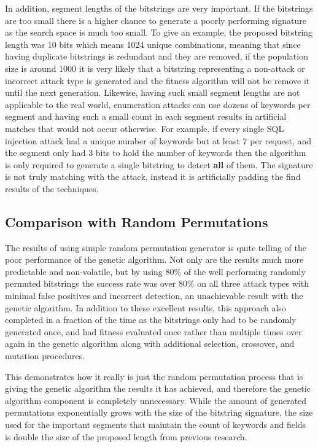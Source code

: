 In addition, segment lengths of the bitstrings are very important.  If the bitstrings are too small there is a higher chance to generate a poorly performing signature as the search space is much too small.  To give an example, the proposed bitstring length was 10 bits which means 1024 unique combinations, meaning that since having duplicate bitstrings is redundant and they are removed, if the population size is around 1000 it is very likely that a bitstring representing a non-attack or incorrect attack type is generated and the fitness algorithm will not be remove it until the next generation.  Likewise, having such small segment lengths are not applicable to the real world, enumeration attacks can use dozens of keywords per segment and having such a small count in each segment results in artificial matches that would not occur otherwise.  For example, if every single SQL injection attack had a unique number of keywords but at least 7 per request, and the segment only had 3 bits to hold the number of keywords then the algorithm is only required to generate a single bitstring to detect \textbf{all} of them.  The signature is not truly matching with the attack, instead it is artificially padding the find results of the techniques.

\subsection{Comparison with Random Permutations}\label{sec:randDiscussion}

The results of using simple random permutation generator is quite telling of the poor performance of the genetic algorithm.  Not only are the results much more predictable and non-volatile, but by using 80\% of the well performing randomly permuted bitstrings the success rate was over 80\% on all three attack types with minimal false positives and incorrect detection, an unachievable result with the genetic algorithm.  In addition to these excellent results, this approach also completed in a fraction of the time as the bitstrings only had to be randomly generated once, and had fitness evaluated once rather than multiple times over again in the genetic algorithm along with additional selection, crossover, and mutation procedures.

This demonstrates how it really is just the random permutation process that is giving the genetic algorithm the results it has achieved, and therefore the genetic algorithm component is completely unnecessary.  While the amount of generated permutations exponentially grows with the size of the bitstring signature, the size used for the important segments that maintain the count of keywords and fields is double the size of the proposed length from previous research.

